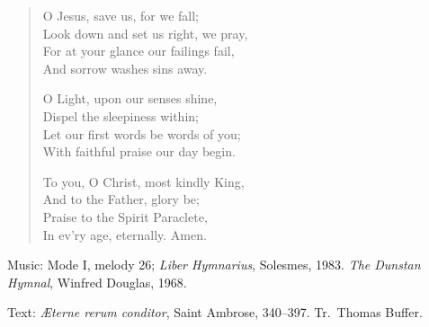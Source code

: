 \hymn



\setlength{\leftmargini}{2em}
\begin{verse}
  O Jesus, save us, for we fall;\\
  Look down and set us right, we pray,\\
  For at your glance our failings fail,\\
  And sorrow washes sins away.

  O Light, upon our senses shine,\\
  Dispel the sleepiness within;\\
  Let our first words be words of you;\\
  With faithful praise our day begin.

  To you, O Christ, most kindly King,\\
  And to the Father, glory be;\\
  Praise to the Spirit Paraclete,\\
  In ev'ry age, eternally.
  Amen.

\end{verse}


\begin{hymnsource}
Music: Mode I, melody 26; \emph{Liber Hymnarius}, Solesmes, 1983. \emph{The Dunstan Hymnal}, Winfred Douglas, 1968.

Text: \emph{Æterne rerum conditor}, Saint Ambrose, 340--397. Tr.~Thomas Buffer.
\end{hymnsource}

